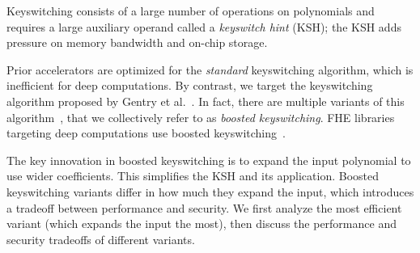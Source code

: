 
Keyswitching consists of a large number of operations on polynomials and 
requires a large auxiliary operand called a  \emph{keyswitch hint} (KSH);
the KSH adds pressure on memory bandwidth and on-chip storage.


Prior accelerators are optimized for the \emph{standard} keyswitching algorithm,
which is inefficient for deep computations.
By contrast, we target the keyswitching algorithm
proposed by Gentry et al.~\cite[Section 3.1]{gentry:crypto2012:homomorphic}.
In fact, there are multiple variants of this algorithm~\cite[Section 5.3.4]{halevi2020helib},
that we collectively refer to as \emph{boosted keyswitching}.
FHE libraries targeting deep computations
use boosted keyswitching~\cite{gentry:crypto2012:homomorphic,halevi2020helib,heaan,mouchet2020lattigo}.

The key innovation in boosted keyswitching is to expand the input polynomial to use wider coefficients.
This simplifies the KSH and its application.
Boosted keyswitching variants differ in how much they expand the input,
which introduces a tradeoff between performance and security.
We first analyze the most efficient variant (which expands the input the most),
then discuss the performance and security tradeoffs of different variants.



